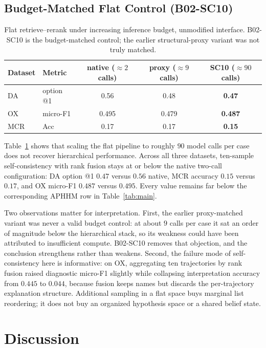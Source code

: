 \subsection{Budget-Matched Flat Control (B02-SC10)}
\label{sec:rq4}

\begin{table}[t]
\centering
\small
\caption{Flat retrieve--rerank under increasing inference budget, unmodified interface. B02-SC10 is the budget-matched control; the earlier structural-proxy variant was not truly matched.}
\label{tab:budget}
\begin{tabular}{llccc}
\toprule
Dataset & Metric & native ($\approx2$ calls) & proxy ($\approx9$ calls) & \textbf{SC10} ($\approx90$ calls) \\
\midrule
DA & option @1 & 0.56 & 0.48 & \textbf{0.47} \\
OX & micro-F1 & 0.495 & 0.479 & \textbf{0.487} \\
MCR & Acc & 0.17 & 0.17 & \textbf{0.15} \\
\bottomrule
\end{tabular}
\end{table}

Table~\ref{tab:budget} shows that scaling the flat pipeline to roughly $90$ model calls per case does not recover hierarchical performance.
Across all three datasets, ten-sample self-consistency with rank fusion stays at or below the native two-call configuration: DA option @1 $0.47$ versus $0.56$ native, MCR accuracy $0.15$ versus $0.17$, and OX micro-F1 $0.487$ versus $0.495$.
Every value remains far below the corresponding APHHM row in Table~\ref{tab:main}.

Two observations matter for interpretation.
First, the earlier proxy-matched variant was never a valid budget control: at about $9$ calls per case it sat an order of magnitude below the hierarchical stack, so its weakness could have been attributed to insufficient compute.
B02-SC10 removes that objection, and the conclusion strengthens rather than weakens.
Second, the failure mode of self-consistency here is informative: on OX, aggregating ten trajectories by rank fusion raised diagnostic micro-F1 slightly while collapsing interpretation accuracy from $0.445$ to $0.044$, because fusion keeps names but discards the per-trajectory explanation structure.
Additional sampling in a flat space buys marginal list reordering; it does not buy an organized hypothesis space or a shared belief state.

\section{Discussion}
\label{sec:discussion}

